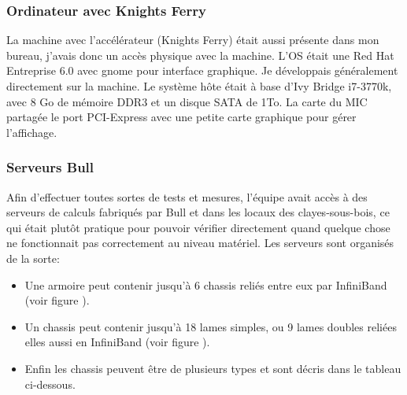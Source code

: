 \documentclass[11pt]{article}
\begin{document}
			\subsubsection{Ordinateur avec Knights Ferry}
			La machine avec l'accélérateur (Knights Ferry) était aussi présente dans mon bureau, j'avais donc un accès physique avec la machine. L'OS était une Red Hat 
			Entreprise 6.0 avec gnome pour interface graphique. Je développais généralement directement sur la machine. Le système hôte était à base 
			d'Ivy Bridge i7-3770k, avec 8 Go de mémoire DDR3 et un disque SATA de 1To. La carte du MIC partagée le port PCI-Express avec une petite 
			carte graphique pour gérer l'affichage.
			\subsubsection{Serveurs Bull}
			Afin d'effectuer toutes sortes de tests et mesures, l'équipe avait accès à des serveurs de calculs fabriqués par Bull et dans les locaux 
			des clayes-sous-bois, ce qui était plutôt pratique pour pouvoir vérifier directement quand quelque chose ne fonctionnait pas correctement 
			au niveau matériel. \newline
			Les serveurs sont organisés de la sorte: \newline
			\begin{itemize}
			\item Une armoire peut contenir jusqu'à 6 chassis reliés entre eux par InfiniBand (voir figure ).
			\item Un chassis peut contenir jusqu'à 18 lames simples, ou 9 lames doubles reliées elles aussi en InfiniBand (voir figure ).
			\item Enfin les chassis peuvent être de plusieurs types et sont décris dans le tableau ci-dessous. \newline
			\end{itemize}
\end{document}
